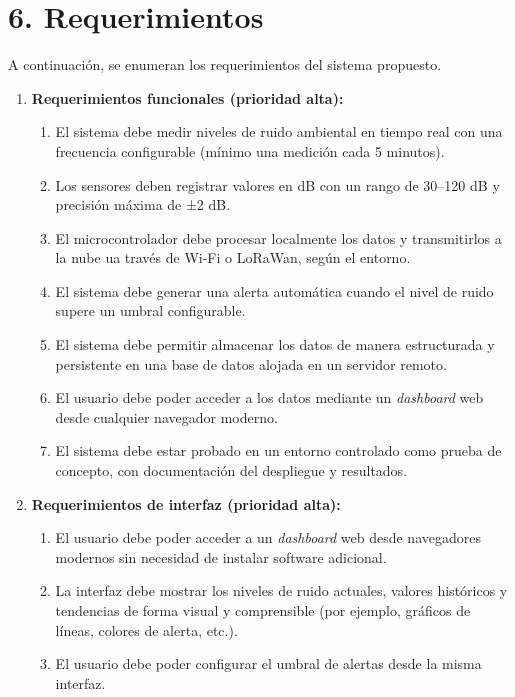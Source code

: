 \documentclass[
11pt, %
]{charter}
\begin{document}
\section{6. Requerimientos}
\label{sec:requerimientos}

A continuación, se enumeran los requerimientos del sistema propuesto.

\begin{enumerate}
    \item \textbf{Requerimientos funcionales (prioridad alta):}
    \begin{enumerate}
        \item El sistema debe medir niveles de ruido ambiental en tiempo real con una frecuencia configurable (mínimo una medición cada 5 minutos).
        \item Los sensores deben registrar valores en dB con un rango de 30–120 dB y precisión máxima de ±2 dB.
        \item El microcontrolador debe procesar localmente los datos y transmitirlos a la nube ua través de Wi-Fi o LoRaWan, según el entorno.
        \item El sistema debe generar una alerta automática cuando el nivel de ruido supere un umbral configurable.
        \item El sistema debe permitir almacenar los datos de manera estructurada y persistente en una base de datos alojada en un servidor remoto.
        \item El usuario debe poder acceder a los datos mediante un \textit{dashboard} web desde cualquier navegador moderno.
        \item El sistema debe estar probado en un entorno controlado como prueba de concepto, con documentación del despliegue y resultados.
    \end{enumerate}

    \item \textbf{Requerimientos de interfaz (prioridad alta):}
    \begin{enumerate}
        \item El usuario debe poder acceder a un \textit{dashboard} web desde navegadores modernos sin necesidad de instalar software adicional.
        \item La interfaz debe mostrar los niveles de ruido actuales, valores históricos y tendencias de forma visual y comprensible (por ejemplo, gráficos de líneas, colores de alerta, etc.).
        \item El usuario debe poder configurar el umbral de alertas desde la misma interfaz.
    \end{enumerate}


\end{enumerate}
\end{document}
